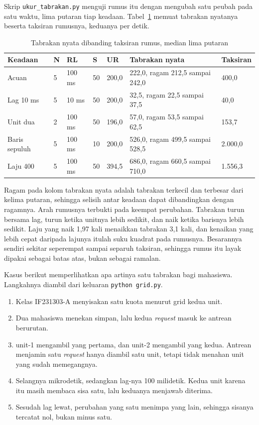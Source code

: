 Skrip \texttt{ukur\_tabrakan.py} menguji rumus itu dengan mengubah satu peubah
pada satu waktu, lima putaran tiap keadaan. Tabel~\ref{tab:tabrakan} memuat
tabrakan nyatanya beserta taksiran rumusnya, keduanya per detik.

\begin{table}[htbp]
  \centering
  \caption{Tabrakan nyata dibanding taksiran rumus, median lima putaran}
  \label{tab:tabrakan}
  \begin{tabularx}{\textwidth}{|l|l|l|l|l|X|l|}
    \hline
    \textbf{Keadaan} & \textbf{N} & \textbf{RL} & \textbf{S} & \textbf{UR} & \textbf{Tabrakan nyata} & \textbf{Taksiran} \\
    \hline
    Acuan & 5 & 100 ms & 50 & 200,0 & 222,0, ragam 212,5 sampai 242,0 & 400,0 \\
    \hline
    Lag 10 ms & 5 & 10 ms & 50 & 200,0 & 32,5, ragam 22,5 sampai 37,5 & 40,0 \\
    \hline
    Unit dua & 2 & 100 ms & 50 & 196,0 & 57,0, ragam 53,5 sampai 62,5 & 153,7 \\
    \hline
    Baris sepuluh & 5 & 100 ms & 10 & 200,0 & 526,0, ragam 499,5 sampai 528,5 & 2.000,0 \\
    \hline
    Laju 400 & 5 & 100 ms & 50 & 394,5 & 686,0, ragam 660,5 sampai 710,0 & 1.556,3 \\
    \hline
  \end{tabularx}
\end{table}

Ragam pada kolom tabrakan nyata adalah tabrakan terkecil dan terbesar dari kelima
putaran, sehingga selisih antar keadaan dapat dibandingkan dengan ragamnya.
Arah rumusnya terbukti pada keempat perubahan. Tabrakan turun bersama lag,
turun ketika unitnya lebih sedikit, dan naik ketika barisnya lebih sedikit.
Laju yang naik 1,97 kali menaikkan tabrakan 3,1 kali, dan kenaikan yang lebih
cepat daripada lajunya itulah suku kuadrat pada rumusnya. Besarannya sendiri
sekitar seperempat sampai separuh taksiran, sehingga rumus itu layak dipakai
sebagai batas atas, bukan sebagai ramalan.

Kasus berikut memperlihatkan apa artinya satu tabrakan bagi mahasiswa.
Langkahnya diambil dari keluaran \texttt{python grid.py}.

\begin{enumerate}
  \item Kelas IF231303-A menyisakan satu kuota menurut grid kedua unit.
  \item Dua mahasiswa menekan simpan, lalu kedua \textit{request} masuk ke
    antrean berurutan.
  \item unit-1 mengambil yang pertama, dan unit-2 mengambil yang kedua.
    Antrean menjamin satu \textit{request} hanya diambil satu unit, tetapi
    tidak menahan unit yang sudah memegangnya.
  \item Selangnya mikrodetik, sedangkan lag-nya 100 milidetik. Kedua unit
    karena itu masih membaca sisa satu, lalu keduanya menjawab diterima.
  \item Sesudah lag lewat, perubahan yang satu menimpa yang lain, sehingga
    sisanya tercatat nol, bukan minus satu.
\end{enumerate}

